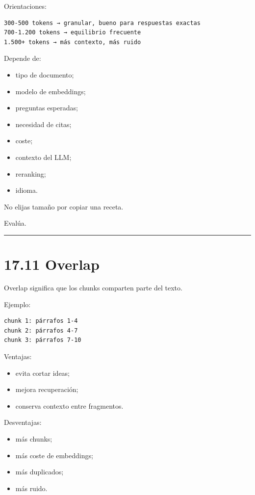 Orientaciones:

\begin{lstlisting}
300-500 tokens → granular, bueno para respuestas exactas
700-1.200 tokens → equilibrio frecuente
1.500+ tokens → más contexto, más ruido
\end{lstlisting}

Depende de:

\begin{itemize}
\tightlist
\item
  tipo de documento;
\item
  modelo de embeddings;
\item
  preguntas esperadas;
\item
  necesidad de citas;
\item
  coste;
\item
  contexto del LLM;
\item
  reranking;
\item
  idioma.
\end{itemize}

No elijas tamaño por copiar una receta.

Evalúa.

\begin{center}\rule{0.5\linewidth}{0.5pt}\end{center}

\section{17.11 Overlap}\label{overlap}

Overlap significa que los chunks comparten parte del texto.

Ejemplo:

\begin{lstlisting}
chunk 1: párrafos 1-4
chunk 2: párrafos 4-7
chunk 3: párrafos 7-10
\end{lstlisting}

Ventajas:

\begin{itemize}
\tightlist
\item
  evita cortar ideas;
\item
  mejora recuperación;
\item
  conserva contexto entre fragmentos.
\end{itemize}

Desventajas:

\begin{itemize}
\tightlist
\item
  más chunks;
\item
  más coste de embeddings;
\item
  más duplicados;
\item
  más ruido.
\end{itemize}

